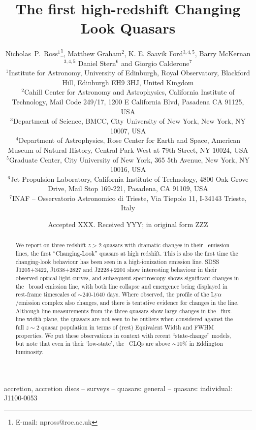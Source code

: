 \documentclass[a4paper,fleqn,usenatbib]{mnras}
\title[High-redshift CLQs]{The first high-redshift Changing Look Quasars}
\author[Ross {\it et al.}]
{%
Nicholas~P.~Ross$^{1}$\thanks{E-mail: npross@roe.ac.uk},
 Matthew Graham$^{2}$, K. E. Saavik Ford$^{3,4,5}$,  Barry McKernan$^{3,4,5}$   
\newauthor Daniel Stern$^{6}$ and Giorgio Calderone$^{7}$
\\
$^{1}$Institute for Astronomy, University of Edinburgh, Royal Observatory, Blackford Hill, Edinburgh EH9 3HJ, United Kingdom \\
$^{2}$Cahill Center for Astronomy and Astrophysics, California Institute of Technology, Mail Code 249/17, 1200 E California Blvd, Pasadena CA 91125, USA\\
$^{3}$Department of Science, BMCC, City University of New York, New York, NY 10007, USA \\
$^{4}$Department of Astrophysics, Rose Center for Earth and Space, American Museum of Natural History, Central Park West at 79th Street, NY 10024, USA \\
$^{5}$Graduate Center, City University of New York, 365 5th Avenue, New York, NY 10016, USA\\
$^{6}$Jet Propulsion Laboratory, California Institute of Technology, 4800 Oak Grove Drive, Mail Stop 169-221, Pasadena, CA 91109, USA \\
$^{7}$INAF -- Osservatorio Astronomico di Trieste, Via Tiepolo 11, I-34143 Trieste, Italy \\
}
\date{Accepted XXX. Received YYY; in original form ZZZ}
\begin{document}
\label{firstpage}
\pagerange{\pageref{firstpage}--\pageref{lastpage}}
\maketitle

\begin{abstract}
We report on three redshift $z>2$ quasars with dramatic changes in
their \civ\ emission lines, the first ``Changing-Look'' quasars at high
redshift.  This is also the first time the changing-look behaviour has
been seen in a high-ionization emission line.
SDSS J1205+3422, J1638+2827 and J2228+2201 show interesting behaviour
in their observed optical light curves, and subsequent spectroscopy
shows significant changes in the \civ\ broad emission line, with both
line collapse and emergence being displayed in rest-frame timescales
of $\sim$240-1640 days.
Where observed, the profile of the Ly$\alpha$/\nv emission complex
also changes, and there is tentative evidence for changes in the \mgii
line.
Although line measurements from the three quasars show large changes
in the \civ\ flux-line width plane, the quasars are not seen to
be outliers when considered against the full $z\sim2$ quasar population
in terms of (rest) Equivalent Width and FWHM properties.
We put these observations in context with recent ``state-change''
models, but note that even in their `low-state', the \civ\ CLQs are
above $\sim$10\% in Eddington luminosity.
\end{abstract}



\begin{keywords}
accretion, accretion discs -- surveys -- quasars: general -- quasars: individual: J1100-0053 
\end{keywords}



\end{document}
